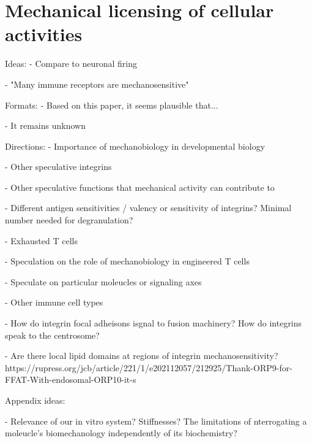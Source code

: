 \section{Mechanical licensing of cellular activities}

Ideas:
- Compare to neuronal firing

- "Many immune receptors are mechanosensitive"

Formats:
- Based on this paper, it seems plausible that...

- It remains unknown 


Directions:
- Importance of mechanobiology in developmental biology

- Other speculative integrins

- Other speculative functions that mechanical activity can contribute to

- Different antigen sensitivities / valency or sensitivity of integrins? Minimal number needed for degranulation?

- Exhausted T cells

- Speculation on the role of mechanobiology in engineered T cells

- Speculate on particular moleucles or signaling axes

- Other immune cell types

- How do integrin focal adheisons isgnal to fusion machinery? How do integrins speak to the centrosome?

- Are there local lipid domains at regions of integrin mechanosensitivity? https://rupress.org/jcb/article/221/1/e202112057/212925/Thank-ORP9-for-FFAT-With-endosomal-ORP10-it-s

Appendix ideas:

- Relevance of our in vitro system? Stiffnesses? The limitations of nterrogating a moleucle's biomechanology independently of its biochemistry?
